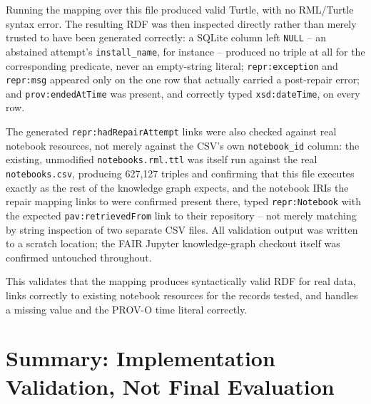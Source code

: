 Running the mapping over this file produced valid Turtle, with no
RML/Turtle syntax error. The resulting RDF was then inspected directly
rather than merely trusted to have been generated correctly: a SQLite column
left \texttt{NULL} -- an abstained attempt's \texttt{install\_name}, for
instance -- produced no triple at all for the corresponding predicate, never
an empty-string literal; \texttt{repr:exception} and \texttt{repr:msg}
appeared only on the one row that actually carried a post-repair error; and
\texttt{prov:endedAtTime} was present, and correctly typed
\texttt{xsd:dateTime}, on every row.

The generated \texttt{repr:hadRepairAttempt} links were also checked against
real notebook resources, not merely against the CSV's own
\texttt{notebook\_id} column: the existing, unmodified
\texttt{notebooks.rml.ttl} was itself run against the real
\texttt{notebooks.csv}, producing 627{,}127 triples and confirming that this
file executes exactly as the rest of the knowledge graph expects, and the
notebook IRIs the repair mapping links to were confirmed present there,
typed \texttt{repr:Notebook} with the expected \texttt{pav:retrievedFrom}
link to their repository -- not merely matching by string inspection of two
separate CSV files. All validation output was written to a scratch
location; the FAIR Jupyter knowledge-graph checkout itself was confirmed
untouched throughout.

This validates that the mapping produces syntactically valid RDF for real
data, links correctly to existing notebook resources for the records
tested, and handles a missing value and the PROV-O time literal correctly.


\section{Summary: Implementation Validation, Not Final Evaluation}
\label{sec:v-summary}



